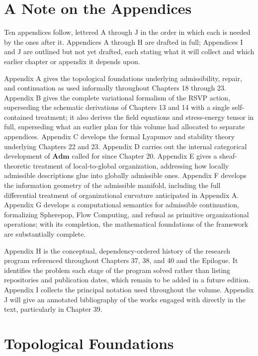 \documentclass[11pt,oneside]{book}
\numberwithin{equation}{chapter}
\theoremstyle{definition}
\theoremstyle{plain}
\begin{document}
\chapter*{A Note on the Appendices}

Ten appendices follow, lettered A through J in the order in which each is
needed by the ones after it. Appendices A through H are drafted in full;
Appendices I and J are outlined but not yet drafted, each stating what it
will collect and which earlier chapter or appendix it depends upon.

Appendix A gives the topological foundations underlying admissibility,
repair, and continuation as used informally throughout Chapters 18
through 23. Appendix B gives the complete variational formalism of the
RSVP action, superseding the schematic derivations of Chapters 13 and 14
with a single self-contained treatment; it also derives the field
equations and stress-energy tensor in full, superseding what an earlier
plan for this volume had allocated to separate appendices. Appendix C
develops the formal Lyapunov and stability theory underlying Chapters 22
and 23. Appendix D carries out the internal categorical development of
\(\mathbf{Adm}\) called for since Chapter 20. Appendix E gives a
sheaf-theoretic treatment of local-to-global organization, addressing how
locally admissible descriptions glue into globally admissible ones.
Appendix F develops the information geometry of the admissible manifold,
including the full differential treatment of organizational curvature
anticipated in Appendix A. Appendix G develops a computational semantics
for admissible continuation, formalizing Spherepop, Flow Computing, and
refusal as primitive organizational operations; with its completion, the
mathematical foundations of the framework are substantially complete.

Appendix H is the conceptual, dependency-ordered history of the research
program referenced throughout Chapters 37, 38, and 40 and the Epilogue. It
identifies the problem each stage of the program solved rather than
listing repositories and publication dates, which remain to be added in a
future edition. Appendix I collects the principal notation used
throughout the volume. Appendix J will give an annotated bibliography of
the works engaged with directly in the text, particularly in Chapter 39.

\appendix

\chapter{Topological Foundations}
\end{document}
